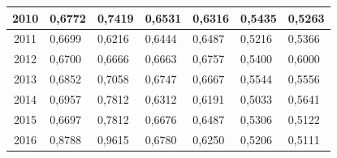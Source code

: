 \begin{table}[H]
\begin{tabular}{|c|l|l|l|l|l|l|}
		2010            & 0,6772                                                 & 0,7419                                                  & 0,6531                                                    & 0,6316                                                     & 0,5435                                                      & 0,5263                                                      \\ \hline
		2011            & 0,6699                                                 & 0,6216                                                  & 0,6444                                                    & 0,6487                                                     & 0,5216                                                      & 0,5366                                                      \\ \hline
		2012            & 0,6700                                                   & 0,6666                                                  & 0,6663                                                    & 0,6757                                                     & 0,5400                                                        & 0,6000                                                         \\ \hline
		2013            & 0,6852                                                 & 0,7058                                                  & 0,6747                                                    & 0,6667                                                     & 0,5544                                                      & 0,5556                                                      \\ \hline
		2014            & 0,6957                                                 & 0,7812                                                  & 0,6312                                                    & 0,6191                                                     & 0,5033                                                      & 0,5641                                                      \\ \hline
		2015            & 0,6697                                                 & 0,7812                                                  & 0,6676                                                    & 0,6487                                                     & 0,5306                                                      & 0,5122                                                      \\ \hline
		2016            & 0,8788                                                 & 0,9615                                                  & 0,6780                                                     & 0,6250                                                      & 0,5206                                                      & 0,5111                                                      \\ \hline

\end{tabular}
\end{table}
